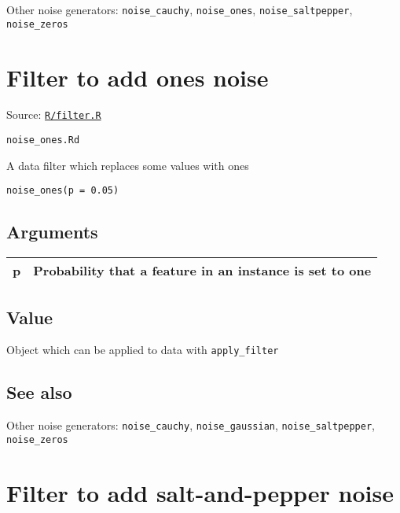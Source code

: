 Other noise generators: \texttt{noise\_cauchy}, \texttt{noise\_ones},
\texttt{noise\_saltpepper}, \texttt{noise\_zeros}

\section{Filter to add ones noise}\label{filter-to-add-ones-noise}

Source:
\href{https://github.com/fdavidcl/ruta/blob/master/R/filter.R}{\texttt{R/filter.R}}

\texttt{noise\_ones.Rd}

A data filter which replaces some values with ones

\begin{verbatim}
noise_ones(p = 0.05)
\end{verbatim}

\hypertarget{arguments}{\subsection{\texorpdfstring{\protect\hyperlink{arguments}{}Arguments}{Arguments}}\label{arguments}}

\begin{longtable}[c]{@{}>{\small}p{3cm}>{\raggedright}p{12.5cm}@{}}
\toprule
p & Probability that a feature in an instance is set to
one\tabularnewline
\bottomrule
\end{longtable}

\hypertarget{value}{\subsection{\texorpdfstring{\protect\hyperlink{value}{}Value}{Value}}\label{value}}

Object which can be applied to data with \texttt{apply\_filter}

\hypertarget{see-also}{\subsection{\texorpdfstring{\protect\hyperlink{see-also}{}See
also}{See also}}\label{see-also}}

Other noise generators: \texttt{noise\_cauchy},
\texttt{noise\_gaussian}, \texttt{noise\_saltpepper},
\texttt{noise\_zeros}

\section{Filter to add salt-and-pepper
noise}\label{filter-to-add-salt-and-pepper-noise}

